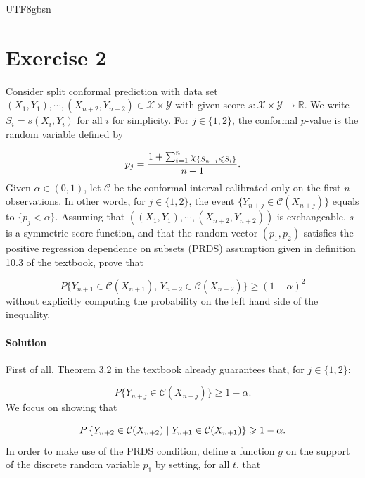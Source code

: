\documentclass[../../main.tex]{subfiles}
\begin{document}
\begin{CJK*}{UTF8}{gbsn}

\section*{Exercise 2}
Consider split conformal prediction 
with data set $(X_1, Y_1), \cdots, (X_{n+2}, Y_{n+2}) 
\in \mathcal{X} \times \mathcal{Y}$ 
with given score 
$s : \mathcal{X} \times \mathcal{Y} \to \mathbb{R}$.
We write $S_i = s(X_i, Y_i)$ for all $i$ for simplicity.
For $j \in \{1,2\}$, the conformal $p$-value is the random variable defined by 

\begin{equation*}
    p_j = \frac{1+\sum_{i=1}^{n}\chi_{ \left \{ S_{n+j}\leqslant S_i \right \}}}{n+1}.
\end{equation*}
Given $\alpha \in (0,1)$,
let $\mathcal{C}$ be the conformal interval 
calibrated only on the first $n$ observations.
In other words, for $j \in \{1,2\}$, 
the event $\{Y_{n+j}\in\mathcal{C}(X_{n+j}) \}$
equals to $\{p_j < \alpha\}$.
Assuming that $((X_1, Y_1), \cdots, (X_{n+2}, Y_{n+2}))$ 
is exchangeable, $s$ is a symmetric score function, 
and that the random vector $(p_1,p_2)$
satisfies the 
positive regression dependence on subsets (PRDS) assumption 
given in definition 10.3 of the textbook,
prove that 

\begin{equation*}
    P\{Y_{n+1}\in\mathcal{C}(X_{n+1}),\,
       Y_{n+2}\in\mathcal{C}(X_{n+2})\}\geqslant(1-\alpha)^2
\end{equation*}
without explicitly computing the probability on the left 
hand side of the inequality.

\paragraph{Solution}
First of all, Theorem 3.2 in the textbook already guarantees that,
for $j \in \{1,2\}$:

\begin{equation*}
    P\{Y_{n+j}\in\mathcal{C}(X_{n+j})\} \geqslant 1-\alpha.
\end{equation*}
We focus on showing that 

\begin{equation*}
    P\left \{ Y_{n+2}\in\mathcal{C}(X_{n+2}) \mid Y_{n+1}\in\mathcal{C}(X_{n+1})  \right \} 
    \geqslant 1-\alpha.
\end{equation*}
In order to make use of the PRDS condition, 
define a function $g$ on the support of the discrete 
random variable $p_1$ by setting,
for all $t$, that 


\end{CJK*}
\end{document}
